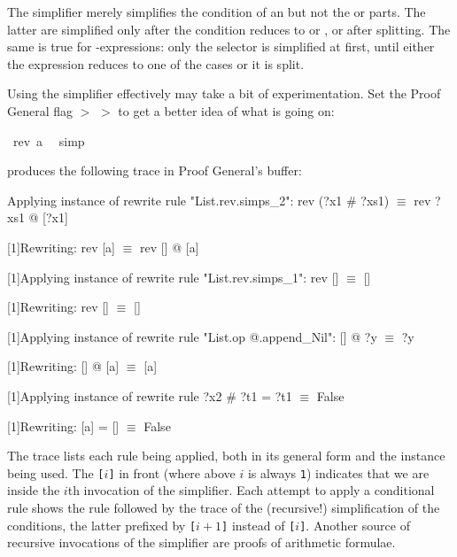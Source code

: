 \begin{isabellebody}
\begin{isamarkuptxt}
\begin{warn}
  The simplifier merely simplifies the condition of an 
   but not the
   or  parts. The latter are simplified only after the
  condition reduces to  or , or after splitting. The
  same is true for -expressions: only the selector is
  simplified at first, until either the expression reduces to one of the
  cases or it is split.
\end{warn}%
\end{isamarkuptxt}%
\isamarkuptrue%
\isamarkupfalse%
%
\isamarkuptrue%
%
\begin{isamarkuptext}%
Using the simplifier effectively may take a bit of experimentation.  Set the
Proof General flag  $>$  $>$  to get a better idea of what is going on:%
\end{isamarkuptext}%
\isamarkuptrue%
\ {\isachardoublequote}rev\ {\isacharbrackleft}a{\isacharbrackright}\ {\isacharequal}\ {\isacharbrackleft}{\isacharbrackright}{\isachardoublequote}\isanewline
\isamarkupfalse%
simp{\isacharparenright}\isamarkupfalse%
\isamarkupfalse%
%
\begin{isamarkuptext}%
\noindent
produces the following trace in Proof General's  buffer:

\begin{ttbox}\makeatother
[1]Applying instance of rewrite rule "List.rev.simps_2":
rev (?x1 # ?xs1) \(\equiv\) rev ?xs1 @ [?x1]

[1]Rewriting:
rev [a] \(\equiv\) rev [] @ [a]

[1]Applying instance of rewrite rule "List.rev.simps_1":
rev [] \(\equiv\) []

[1]Rewriting:
rev [] \(\equiv\) []

[1]Applying instance of rewrite rule "List.op @.append_Nil":
[] @ ?y \(\equiv\) ?y

[1]Rewriting:
[] @ [a] \(\equiv\) [a]

[1]Applying instance of rewrite rule
?x2 # ?t1 = ?t1 \(\equiv\) False

[1]Rewriting:
[a] = [] \(\equiv\) False
\end{ttbox}
The trace lists each rule being applied, both in its general form and
the instance being used. The \texttt{[}$i$\texttt{]} in front (where
above $i$ is always \texttt{1}) indicates that we are inside the $i$th
invocation of the simplifier. Each attempt to apply a
conditional rule shows the rule followed by the trace of the
(recursive!) simplification of the conditions, the latter prefixed by
\texttt{[}$i+1$\texttt{]} instead of \texttt{[}$i$\texttt{]}.
Another source of recursive invocations of the simplifier are
proofs of arithmetic formulae.


\end{isamarkuptext}
\end{isabellebody}
